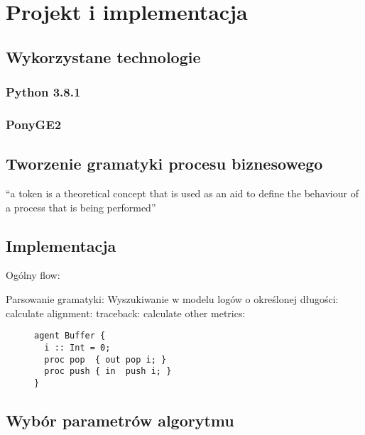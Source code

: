 \chapter{Projekt i implementacja}

\section{Wykorzystane technologie}
\subsection{Python 3.8.1}
\subsection{PonyGE2}



\section{Tworzenie gramatyki procesu biznesowego}

“a token is a theoretical concept that is used as an aid to define the behaviour of a process that is being
performed”

\section{Implementacja}

Ogólny flow:


Parsowanie gramatyki:
Wyszukiwanie w modelu logów o określonej długości:
calculate alignment:
traceback:
calculate other metrics:

\begin{figure}[!ht]
\lstset{caption=Parser gramatyki, captionpos=b}
\lstset{label=src:passive, frame=single}
\begin{lstlisting}
agent Buffer {
  i :: Int = 0;
  proc pop  { out pop i; }
  proc push { in  push i; }
}
\end{lstlisting}
\end{figure}

\section{Wybór parametrów algorytmu}
